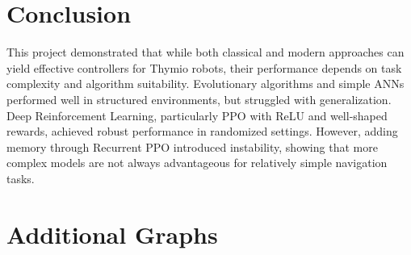 \documentclass[final,5p,times,twocolumn,authoryear]{elsarticle}
\begin{document}




\section{Conclusion}

This project demonstrated that while both classical and modern approaches can yield effective controllers for Thymio robots, their performance depends on task complexity and algorithm suitability. Evolutionary algorithms and simple ANNs performed well in structured environments, but struggled with generalization. Deep Reinforcement Learning, particularly PPO with ReLU and well-shaped rewards, achieved robust performance in randomized settings. However, adding memory through Recurrent PPO introduced instability, showing that more complex models are not always advantageous for relatively simple navigation tasks.




\appendix
\section{Additional Graphs}
\label{sec:appendix}
\end{document}
